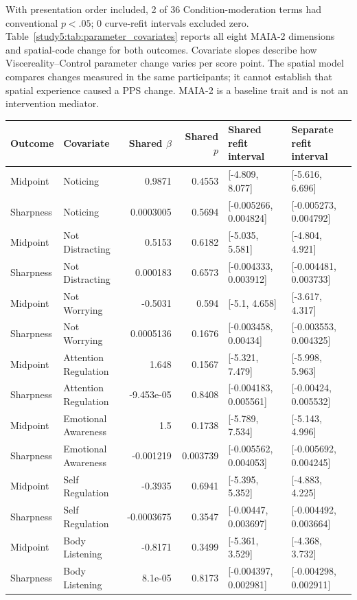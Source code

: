 With presentation order included, 2 of 36 Condition-moderation terms had conventional $p<.05$; 0 curve-refit intervals excluded zero. Table~\ref{study5:tab:parameter_covariates} reports all eight MAIA-2 dimensions and spatial-code change for both outcomes. Covariate slopes describe how Viscereality--Control parameter change varies per score point. The spatial model compares changes measured in the same participants; it cannot establish that spatial experience caused a PPS change. MAIA-2 is a baseline trait and is not an intervention mediator.

\begin{table}[htbp]
\centering\scriptsize
\begin{tabular}{llrrll}
Outcome & Covariate & Shared $\beta$ & Shared $p$ & Shared refit interval & Separate refit interval \\
\hline
Midpoint & Noticing & 0.9871 & 0.4553 & [-4.809, 8.077] & [-5.616, 6.696] \\
Sharpness & Noticing & 0.0003005 & 0.5694 & [-0.005266, 0.004824] & [-0.005273, 0.004792] \\
Midpoint & Not Distracting & 0.5153 & 0.6182 & [-5.035, 5.581] & [-4.804, 4.921] \\
Sharpness & Not Distracting & 0.000183 & 0.6573 & [-0.004333, 0.003912] & [-0.004481, 0.003733] \\
Midpoint & Not Worrying & -0.5031 & 0.594 & [-5.1, 4.658] & [-3.617, 4.317] \\
Sharpness & Not Worrying & 0.0005136 & 0.1676 & [-0.003458, 0.00434] & [-0.003553, 0.004325] \\
Midpoint & Attention Regulation & 1.648 & 0.1567 & [-5.321, 7.479] & [-5.998, 5.963] \\
Sharpness & Attention Regulation & -9.453e-05 & 0.8408 & [-0.004183, 0.005561] & [-0.00424, 0.005532] \\
Midpoint & Emotional Awareness & 1.5 & 0.1738 & [-5.789, 7.534] & [-5.143, 4.996] \\
Sharpness & Emotional Awareness & -0.001219 & 0.003739 & [-0.005562, 0.004053] & [-0.005692, 0.004245] \\
Midpoint & Self Regulation & -0.3935 & 0.6941 & [-5.395, 5.352] & [-4.883, 4.225] \\
Sharpness & Self Regulation & -0.0003675 & 0.3547 & [-0.00447, 0.003697] & [-0.004492, 0.003664] \\
Midpoint & Body Listening & -0.8171 & 0.3499 & [-5.361, 3.529] & [-4.368, 3.732] \\
Sharpness & Body Listening & 8.1e-05 & 0.8173 & [-0.004397, 0.002981] & [-0.004298, 0.002911] \\

\end{tabular}
\end{table}

